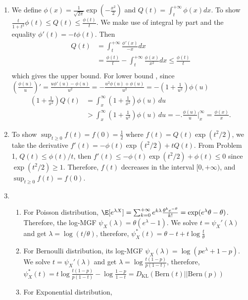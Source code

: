 \documentclass{article}
\begin{document}
\courseheader
{}

\begin{enumerate}
\item We define $\phi(x)=\frac{1}{\sqrt{2\pi}}\exp(-\frac{x^2}{2})$
and $Q(t) = \int_t^{+\infty} \phi(x)dx$. To show
$\frac{t}{1+t^2} \phi(t) \leq Q(t) \leq \frac{\phi(t)}{t}$. We make use of integral by part
and the equality $\phi'(t)=-t\phi(t)$.
Then
\begin{align*}
    Q(t) &= \int_t^{+\infty} \frac{\phi'(x)}{-x}dx\\
    &=\frac{\phi(t)}{t}-\int_t^{+\infty}\frac{\phi(x)}{x^2}dx\leq \frac{\phi(t)}{t} \\
\end{align*}
which gives the upper bound.
For lower bound \cite{elements},
since $(\frac{\phi(u)}{u})'=\frac{u\phi'(u)-\phi(u)}{u^2}=-\frac{u^2\phi(u)+\phi(u)}{u^2}=-(1+\frac{1}{u^2})\phi(u)$
\begin{align*}
    \left(1+\frac1{x^2}\right)Q(t) &=\int_x^\infty \left(1+\frac1{x^2}\right)\phi(u)\,du \\&>\int_x^\infty \left(1+\frac1{u^2}\right)\phi(u)\,du =-\biggl.\frac{\phi(u)}u\biggr|_x^\infty
=\frac{\phi(x)}x.
\end{align*}
\item To show $\sup_{t\geq 0}f(t)=f(0)=\frac{1}{2}$
where $f(t)= Q(t) \exp(t^2/2)$, we take the derivative
$f'(t)=-\phi(t)\exp(t^2/2) + tQ(t)$.
From Problem 1, $Q(t)\leq \phi(t)/ t$, then
$f'(t)\leq -\phi(t)\exp(t^2/2)+\phi(t)\leq 0$ since $\exp(t^2/2)\geq 1$. Therefore, $f(t)$ decreases
in the interval $[0,+\infty)$, and $\sup_{t\geq 0}f(t)=f(0)$.
\item 
\begin{enumerate}
    \item For Poisson distribution,
    $\E[e^{\lambda X}] = \sum_{k=0}^{+\infty}
    e^{k\lambda} \frac{\theta^k e^{-\theta}}{k!}
    =\exp(e^{\lambda }\theta - \theta)$.
    Therefore, the log-MGF $\psi_X(\lambda)= \theta(e^{\lambda} - 1)$. We solve
    $t=\psi_X'(\lambda)$ and get $\lambda = \log(t/\theta)$, therefore, $\psi_X^*(t)=
    \theta - t + t\log\frac{t}{\theta}$
    \item For Bernoulli distribution,
    its log-MGF $\psi_X(\lambda)=\log(pe^{\lambda}+1-p)$.
     We solve
    $t=\psi_X'(\lambda)$ and get $\lambda = \log\frac{t(1-p)}{p(1-t)}$, therefore, $\psi_X^*(t)=
    t\log\frac{t(1-p)}{p(1-t)}-\log\frac{1-p}{1-t}
    =D_{\mathrm{KL}}(\mathrm{Bern}(t)||\mathrm{Bern}(p))$
    \item For Exponential distribution,

\end{enumerate}
\end{enumerate}
\end{document}
